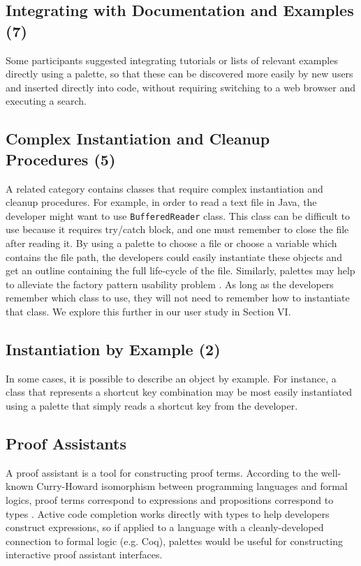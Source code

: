 \documentclass[10pt, conference, compsocconf]{IEEEtran}
\begin{document}
\subsection{Integrating with Documentation and Examples (7)}
Some participants suggested integrating tutorials or lists of relevant examples directly using a palette, so that these can be discovered more easily by new users and inserted directly into code, without requiring switching to a web browser and executing a search.

\subsection{Complex Instantiation and Cleanup Procedures (5)}
A related category contains classes that require complex instantiation and cleanup procedures. For example, in order to read a text file in Java, the developer might want to use \texttt{BufferedReader} class. This class can be difficult to use because it requires try/catch block, and one must remember to close the file after reading it. By using a palette to choose a file or choose a variable which contains the file path, the developers could easily instantiate these objects and get an outline containing the full life-cycle of the file. Similarly, palettes may help to alleviate the factory pattern usability problem \cite{ellis_factory_2007}. As long as the developers remember which class to use, they will not need to remember how to instantiate that class. We explore this further in our user study in Section VI.


\subsection{Instantiation by Example (2)}
In some cases, it is possible to describe an object by example. For instance, a class that represents a shortcut key combination may be most easily instantiated using a palette that simply reads a shortcut key from the developer.

\subsection{Proof Assistants}
A proof assistant is a tool for constructing proof terms. According to the well-known Curry-Howard isomorphism between programming languages and formal logics, proof terms correspond to expressions and propositions correspond to types \cite{tapl}. Active code completion works directly with types to help developers construct expressions, so if applied to a language with a cleanly-developed connection to formal logic (e.g. Coq), palettes would be useful for constructing  interactive proof assistant interfaces.
\end{document}
